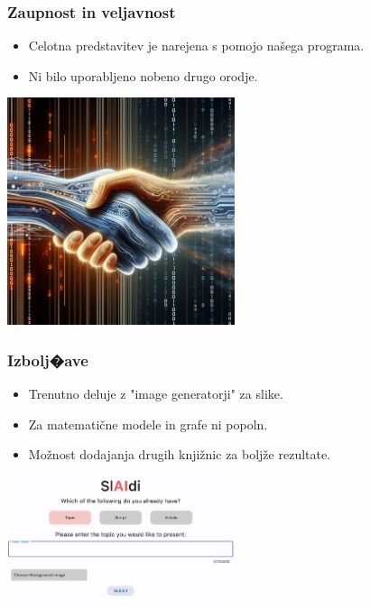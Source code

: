 \documentclass{beamer}
\begin{document}
\begin{frame}
\frametitle{Zaupnost in veljavnost}
\begin{itemize}
    \item Celotna predstavitev je narejena s pomojo našega programa.
    \item Ni bilo uporabljeno nobeno drugo orodje.
\end{itemize}
\centering
\includegraphics[width=0.5\textwidth]{./images/trust.png}
\end{frame}

\begin{frame}
\frametitle{Izbolj�ave}
\begin{itemize}
    \item Trenutno deluje z "image generatorji" za slike.
    \item Za matematične modele in grafe ni popoln.
    \item Možnost dodajanja drugih knjižnic za boljže rezultate.
\end{itemize}
\centering
\includegraphics[width=0.5\textwidth]{./images/improvements.png}
\end{frame}
\end{document}

